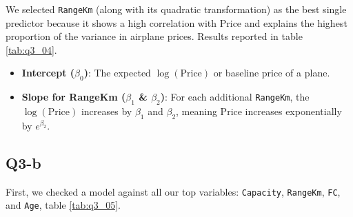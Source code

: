 We selected \texttt{RangeKm} (along with its quadratic transformation) as the best single predictor because it shows a high correlation with Price and explains the highest proportion of the variance in airplane prices. Results reported in table \ref{tab:q3_04}.
\begin{itemize}
    \item \textbf{Intercept ($\beta_0$)}: The expected $\log(\text{Price})$ or baseline price of a plane.
    \item \textbf{Slope for RangeKm ($\beta_1$ \& $\beta_2$)}: For each additional \texttt{RangeKm}, the $\log(\text{Price})$ increases by $\beta_1$ and $\beta_2$, meaning Price increases exponentially by $e^{\beta_2}$.
\end{itemize}

\subsection{Q3-b}

First, we checked a model against all our top variables: \texttt{Capacity}, \texttt{RangeKm}, \texttt{FC}, and \texttt{Age}, table \ref{tab:q3_05}.

